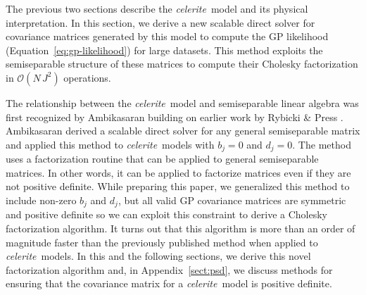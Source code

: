\documentclass[manuscript, letterpaper]{aastex6}
\makeatletter
\let\origsection\section
\renewcommand\section{\@ifstar{\starsection}{\nostarsection}}
\newcommand\nostarsection[1]{\sectionprelude\origsection{#1}}
\newcommand\starsection[1]{\sectionprelude\origsection*{#1}}
\newcommand\sectionprelude{\vspace{1em}}
\newcommand{\celeriteterm}{\emph{celerite}}
\renewcommand{\eqref}[1]{\ref{eq:#1}}
\newcommand{\eqalt}[1]{Equation~\eqref{#1}}
\newcommand{\sectref}[1]{\ref{sect:#1}}
\newcommand{\App}[1]{Appendix~\sectref{#1}}
\newcommand{\app}[1]{\App{#1}}
\newcommand{\sectlabel}[1]{\label{sect:#1}}
\newcommand{\response}[1]{{#1}}
\newcommand{\responseb}[1]{{#1}}
\makeatother
\begin{document}
\response{
\section{Semiseparable matrices \& celerite}\sectlabel{factor}

The previous two sections describe the \celeriteterm\ model and its physical
interpretation.
In this section, we derive a new scalable direct solver for covariance
matrices generated by this model to compute the GP likelihood
(\eqalt{gp-likelihood}) for large datasets.
This method exploits the semiseparable structure of these matrices to compute
their Cholesky factorization in $\mathcal{O}(N\,J^2)$ operations.

The relationship between the \celeriteterm\ model and semiseparable linear
algebra was first recognized by Ambikasaran \citep{Ambikasaran:2015} building
on earlier work by Rybicki \& Press \citep{Rybicki:1995}.
Ambikasaran derived a scalable direct solver for any general semiseparable
matrix and applied this method to \celeriteterm\ models with $b_j = 0$ and
$d_j = 0$.
\responseb{The \citet{Ambikasaran:2015} method uses a factorization routine
    that can be applied to general semiseparable matrices.
    In other words, it can be applied to factorize matrices even if they are not
    positive definite.
    While preparing this paper, we generalized this method to include non-zero
    $b_j$ and $d_j$, but all valid GP covariance matrices are symmetric and
    positive definite so we can exploit this constraint to derive a Cholesky
    factorization algorithm.
    It turns out that this algorithm is more than an order of magnitude faster
    than the previously published method when applied to \celeriteterm\ models.
    In this and the following sections, we derive this novel factorization
    algorithm and, in \app{psd}, we discuss methods for ensuring that the
    covariance matrix for a \celeriteterm\ model is positive definite.}

}
\end{document}
